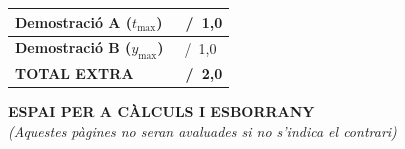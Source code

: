 \documentclass[12pt,a4paper,twoside]{article}
\begin{document}
\vfill

\noindent
\begin{tabularx}{\textwidth}{|>{\raggedright\arraybackslash}X|>{\centering\arraybackslash}p{5cm}|}
  \hline
  \rule{0pt}{22pt}\textbf{Demostració A ($t_{\max}$)} & \Large\hspace{2.5cm}~/~1,0 \\[8pt]
  \hline
  \rule{0pt}{22pt}\textbf{Demostració B ($y_{\max}$)} & \Large\hspace{2.5cm}~/~1,0 \\[8pt]
  \hline
  \rule{0pt}{22pt}\textbf{\Large TOTAL EXTRA} & \Large\textbf{\hspace{2.5cm}~/~2,0} \\[8pt]
  \hline
\end{tabularx}

\cleardoublepage

\pagestyle{empty}
\begin{center}
  \vspace*{2cm}
  {\Large\bfseries ESPAI PER A CÀLCULS I ESBORRANY}\\[1cm]
  \textit{(Aquestes pàgines no seran avaluades si no s'indica el contrari)}
\end{center}

\newpage
\mbox{}
\end{document}
